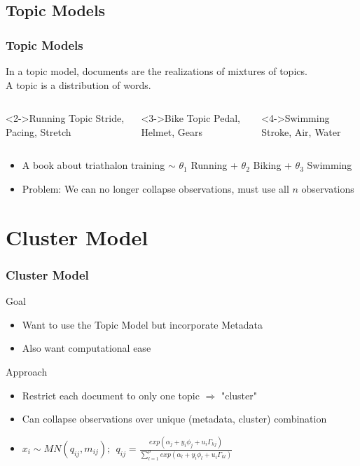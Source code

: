 \documentclass{beamer}
\begin{document}
\subsection{Topic Models}
\begin{frame}
 \frametitle{Topic Models}
In a topic model, documents are the realizations of mixtures of topics. \\ A topic is a distribution of words. 

\begin{columns}
\begin{block}<2->{Running Topic}
Stride, Pacing, Stretch
\end{block}
\begin{block}<3->{Bike Topic}
Pedal, Helmet, Gears
\end{block}
\begin{block}<4->{Swimming}
Stroke, Air, Water
\end{block}
\end{columns}
\begin{itemize}
\item A book about triathalon training $\sim$ $\theta_1$ Running + $\theta_2$ Biking + $\theta_3$ Swimming
\item Problem: We can no longer collapse observations, must use all $n$ observations
\end{itemize}
\end{frame}



\section{Cluster Model}
\begin{frame}
 \frametitle{Cluster Model}
\begin{block}{Goal}
\begin{itemize}
\item Want to use the Topic Model but incorporate Metadata
\item Also want computational ease
\end{itemize}
\end{block}

\begin{block}{Approach}
\begin{itemize}
\item Restrict each document to only one topic $\Rightarrow$ "cluster"
\item Can collapse observations over unique (metadata, cluster) combination
\item $ x_{i} \sim MN(q_{ij},m_{ij})    ; ~~  q_{ij} = \frac{exp(\alpha_j + y_i \phi_j + u_i \Gamma_{kj})}{\sum_{l=1}^{p}{exp(\alpha_l+ y_i \phi_l + u_i \Gamma_{kl})}} $
\end{itemize}
\end{block}
\end{frame}
\end{document}
